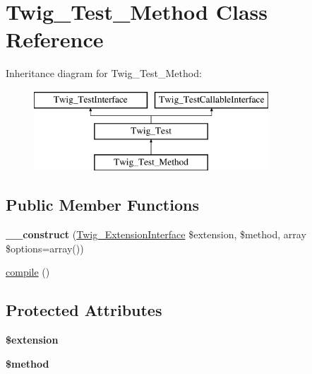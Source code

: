 \hypertarget{classTwig__Test__Method}{}\section{Twig\+\_\+\+Test\+\_\+\+Method Class Reference}
\label{classTwig__Test__Method}
Inheritance diagram for Twig\+\_\+\+Test\+\_\+\+Method\+:\begin{figure}[H]
\begin{center}
\leavevmode
\includegraphics[height=3.000000cm]{classTwig__Test__Method}
\end{center}
\end{figure}
\subsection*{Public Member Functions}
\begin{DoxyCompactItemize}
\item 
{\bfseries \+\_\+\+\_\+construct} (\hyperlink{interfaceTwig__ExtensionInterface}{Twig\+\_\+\+Extension\+Interface} \$extension, \$method, array \$options=array())\hypertarget{classTwig__Test__Method_ae189e878323bf85b3c18bb2740792dc1}{}\label{classTwig__Test__Method_ae189e878323bf85b3c18bb2740792dc1}

\item 
\hyperlink{classTwig__Test__Method_a16b20dd9eef519cd83ccb4f2bc1072aa}{compile} ()
\end{DoxyCompactItemize}
\subsection*{Protected Attributes}
\begin{DoxyCompactItemize}
\item 
{\bfseries \$extension}\hypertarget{classTwig__Test__Method_a588bc9ba5d62f9ff68def154e3ad4aa7}{}\label{classTwig__Test__Method_a588bc9ba5d62f9ff68def154e3ad4aa7}

\item 
{\bfseries \$method}\hypertarget{classTwig__Test__Method_ab11da84507f5898218489b9d4aa67a7e}{}\label{classTwig__Test__Method_ab11da84507f5898218489b9d4aa67a7e}

\end{DoxyCompactItemize}


